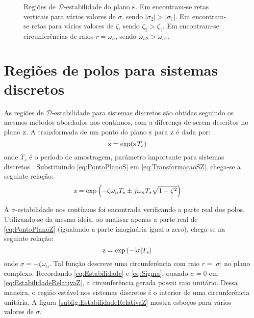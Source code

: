 \begin{figure}[!hb]
  \centering
  \begin{subfigure}[t]{0.3\columnwidth}
      
      \caption{}
      \label{subfig:EstabilidadeRelativaS}
  \end{subfigure}
  \begin{subfigure}[t]{0.3\columnwidth}
      
      \caption{}
      \label{subfig:TaxaDeAmortecimentoS}
  \end{subfigure}
  \begin{subfigure}[t]{0.35\columnwidth}
    
    \caption{}
    \label{subfig:OscilacaoNaoAmortecidaS}
  \end{subfigure}
  \caption{Regiões de $\mathscr{D}$-estabilidade do plano $\operatorname{\mathrm{s}}$. Em  encontram-se retas verticais para vários valores de $\sigma$, sendo $|\sigma_2| > |\sigma_1|$. Em  encontram-se retas para vários valores de $\zeta$, sendo $\zeta_2 > \zeta_1$. Em  encontram-se circunferências de raios $r = \omega_n$, sendo $\omega_{n2} > \omega_{n1}$.}
  \label{fig:RegioesPlanoS}
\end{figure}

\section{Regiões de polos para sistemas discretos}\label{sec:DEstabilidadeZ}

As regiões de $\mathscr{D}$-estabilidade para sistemas discretos são obtidas seguindo os mesmos métodos abordados nos contínuos, com a diferença de serem descritos no plano $\operatorname{\mathrm{z}}$. A transformada de um ponto do plano $\operatorname{\mathrm{s}}$ para $\operatorname{\mathrm{z}}$ é dada por:
\begin{equation}
  \operatorname{\mathrm{z}} = \exp(\operatorname{\mathrm{s}} T_s)\label{eq:TransformacaoSZ}
\end{equation}
onde $T_s$ é o período de amostragem, parâmetro importante para sistemas discretos \cite{KUO1980}. Substituindo \eqref{eq:PontoPlanoS} em \eqref{eq:TransformacaoSZ}, chega-se a seguinte relação:
\begin{equation}
  \operatorname{\mathrm{z}} = \exp{\left(-\zeta\omega_nT_s \pm j\omega_nT_s\sqrt{1-\zeta^2}\right)}\label{eq:PontoPlanoZ}
\end{equation}

A $\sigma$-estabilidade nos contínuos foi encontrada verificando a parte real dos polos. Utilizando-se da mesma ideia, ao analisar apenas a parte real de \eqref{eq:PontoPlanoZ} (igualando a parte imaginária igual a zero), chega-se na seguinte relação:
\begin{equation}
  \operatorname{\mathrm{z}} = \exp{\left(-|\sigma|T_s\right)}\label{eq:EstabilidadeRelativaZ}
\end{equation}
onde $\sigma = -\zeta\omega_n$. Tal função descreve uma circunferência com raio $r = |\sigma|$ no plano complexo. Recordando \eqref{eq:Estabilidade} e \eqref{eq:Sigma}, quando $\sigma = 0$ em \eqref{eq:EstabilidadeRelativaZ}, a circunferência gerada possui raio unitário. Dessa maneira, o região estável nos sistemas discretos é o interior de uma circunferência unitária. A figura \ref{subfig:EstabilidadeRelativaZ} mostra esboços para vários valores de $\sigma$. 

